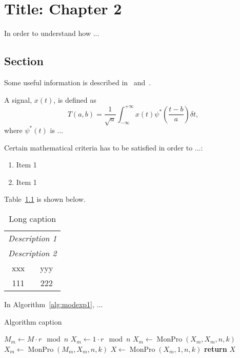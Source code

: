 \chapter{Title: Chapter 2}
\label{chap2}
In order to understand how ...

\section{Section}
\label{sec2}
Some useful information is described in~\cite{powerbook} and~\cite{convdef}.

A signal, $ x(t) $, is defined as
\begin{equation}
\label{eq:cwttrans}
	T(a,b) = \frac{1}{\sqrt{a}}\int_{-\infty}^{+\infty}x(t)\psi^{\ast}(\dfrac{t-b}{a})\delta t,
\end{equation} where $ \psi^{\ast}(t) $ is ...

Certain mathematical criteria has to be satisfied in order to ...:
\begin{enumerate}
	\item Item 1
	\item Item 1
\end{enumerate} 

Table~\ref{tab:tab1} is shown below.

\begin{table}[!ht]
\centering
\begin{tabular}{|c|c|}\hline
\multicolumn{2}{|c|}{\emph{Description 1 }} \\ %
\multicolumn{2}{|c|}{\emph{Description 2}} \\ \hline \hline
xxx & yyy \\ \hline
111 & 222 \\ \hline
\end{tabular}
\caption[Short caption]{Long caption}
\label{tab:tab1}
\end{table}

In Algorithm~\ref{alg:modexp1}, ...

\begin{algorithm}[!ht]
\caption{Algorithm caption}\label{alg:modexp1}
\small
\begin{algorithmic}[1]
 \State $M_m \gets M\cdot  r \mod n$
 \State $X_m \gets 1\cdot  r \mod n$
  \State $X_m \gets \operatorname{MonPro}(X_m, X_m, n, k)$
   \State $X_m \gets \operatorname{MonPro}(M_m, X_m, n, k)$
  \EndIf
 \EndFor
 \State $X \gets \operatorname{MonPro}(X_m, 1, n, k)$
 \State \textbf{return} $X$
\EndProcedure
\end{algorithmic}
\normalsize
\end{algorithm}
